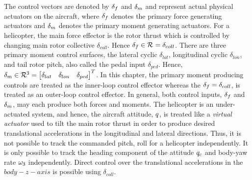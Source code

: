 The control vectors are denoted by $\delta_f$ and $\delta_m$ and represent
actual physical actuators on the aircraft, where $\delta_f$ denotes the
primary force generating actuators and $\delta_m$ denotes the primary
moment generating actuators. For a helicopter, the main force
effector is the rotor thrust which is controlled by changing main
rotor collective $\delta_{coll}$. Hence $\delta_f \in \mathcal{R}^{} =
\delta_{coll}$. There are three primary moment control surfaces, the
lateral cyclic $\delta_{lat}$, longitudinal cyclic $\delta_{lon}$,
and tail rotor pitch, also called the pedal input $\delta_{ped}$.
Hence, $\delta_m \in \mathcal{R}^{3} =
\begin{bmatrix}
\delta_{lat} & \delta_{lon} & \delta_{ped}
\end{bmatrix}^T$.
In this chapter, the primary moment producing controls are treated as the inner-loop control effector whereas the $\delta_f = \delta_{coll}$, is treated as an outer-loop control effector. In general, both control inputs, $\delta_f$ and $\delta_m$, may
each produce both forces and moments. The helicopter is an under-actuated
system, and hence, the aircraft attitude, $q$, is treated like a
\emph{virtual actuator} used to tilt the main rotor thrust in order to
produce desired translational accelerations in the longitudinal and lateral directions. Thus, it is not possible to track the commanded pitch, roll for a helicopter independently. It is only possible to track the heading component of the attitude $q_c$ and body-yaw rate $\omega_3$ independently. Direct control over the translational accelerations in the $body-z-axis$ is possible using $\delta_{coll}$.

